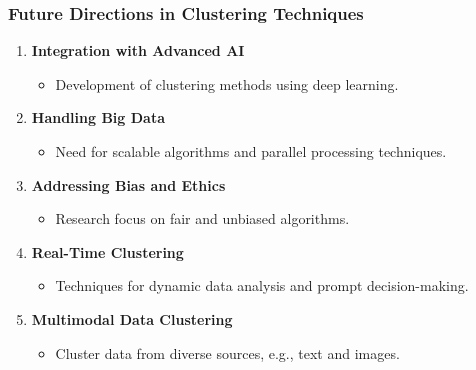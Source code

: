 \documentclass[aspectratio=169]{beamer}
\begin{document}
\begin{frame}[fragile]
    \frametitle{Future Directions in Clustering Techniques}
    \begin{enumerate}
        \item \textbf{Integration with Advanced AI}
            \begin{itemize}
                \item Development of clustering methods using deep learning.
            \end{itemize}

        \item \textbf{Handling Big Data}
            \begin{itemize}
                \item Need for scalable algorithms and parallel processing techniques.
            \end{itemize}

        \item \textbf{Addressing Bias and Ethics}
            \begin{itemize}
                \item Research focus on fair and unbiased algorithms.
            \end{itemize}
        
        \item \textbf{Real-Time Clustering}
            \begin{itemize}
                \item Techniques for dynamic data analysis and prompt decision-making.
            \end{itemize}

        \item \textbf{Multimodal Data Clustering}
            \begin{itemize}
                \item Cluster data from diverse sources, e.g., text and images.
            \end{itemize}    
    \end{enumerate}
\end{frame}
\end{document}
